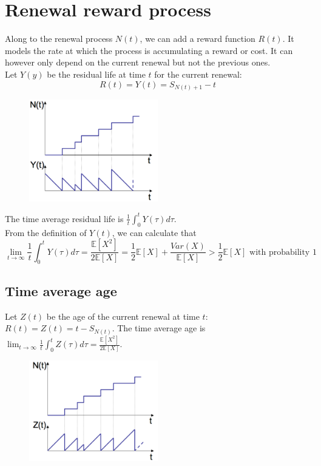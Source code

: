 \documentclass[12pt, openany]{report}
\newcommand{\E}{\mathbb{E}}
\theoremstyle{definition}
\begin{document}
\section{Renewal reward process}
Along to the renewal process $N(t)$, we can add a reward function $R(t)$. It models the rate at which the process is accumulating a reward or cost. It can however only depend on the current renewal but not the previous ones. \\
Let $Y(y)$ be the residual life at time $t$ for the current renewal:
\begin{equation}
	R(t)=Y(t)=S_{N(t)+1}-t
\end{equation}
\begin{figure}[H]
	\centering
	\includegraphics[width=0.5\textwidth]{img/reward.png}
\end{figure}
The time average residual life is $\frac{1}{t}\int_0^t Y(\tau)d\tau$.\\
From the definition of $Y(t)$, we can calculate that 
\begin{equation}
	\lim_{t\to \infty} \frac{1}{t}\int_0^t Y(\tau)d\tau = \frac{\E[X^2]}{2\E[X]} = \frac{1}{2}\E[X] + \frac{Var(X)}{\E[X]} > \frac{1}{2}\E[X]\text{ with probability 1}
\end{equation}
\subsection{Time average age}
Let $Z(t)$ be the age of the current renewal at time $t$: $R(t)=Z(t)=t-S_{N(t)}$. The time average age is $\lim_{t\to \infty} \frac{1}{t}\int_0^t Z(\tau)d\tau= \frac{\E[X^2]}{2\E[X]}$.\\
\begin{figure}[H]
	\centering
	\includegraphics[width=0.5\textwidth]{img/age.png}
\end{figure}
\end{document}
